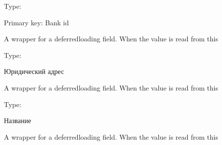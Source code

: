 \documentclass[letterpaper,10pt,russian]{sphinxmanual}
\begin{document}
\begin{fulllineitems}
\begin{quote}
\begin{description}
\end{description}\end{quote}

\begin{fulllineitems}
\label{\detokenize{myapp:polls.models.Bank.bank_id}}
\pysigstartsignatures
\pysigline
{}
\pysigstopsignatures
\sphinxAtStartPar
Type: 

\sphinxAtStartPar
Primary key: Bank id

\sphinxAtStartPar
A wrapper for a deferred\sphinxhyphen{}loading field. When the value is read from this

\end{fulllineitems}


\begin{fulllineitems}
\label{\detokenize{myapp:polls.models.Bank.legal_address}}
\pysigstartsignatures
\pysigline
{}
\pysigstopsignatures
\sphinxAtStartPar
Type: 

\sphinxAtStartPar
Юридический адрес

\sphinxAtStartPar
A wrapper for a deferred\sphinxhyphen{}loading field. When the value is read from this

\end{fulllineitems}


\begin{fulllineitems}
\label{\detokenize{myapp:polls.models.Bank.name}}
\pysigstartsignatures
\pysigline
{}
\pysigstopsignatures
\sphinxAtStartPar
Type: 

\sphinxAtStartPar
Название

\sphinxAtStartPar
A wrapper for a deferred\sphinxhyphen{}loading field. When the value is read from this


\end{fulllineitems}
\end{fulllineitems}
\end{document}
